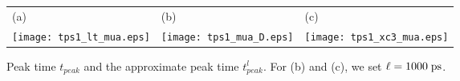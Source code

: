 \documentclass[10pt]{article}
\numberwithin{equation}{section}
\numberwithin{figure}{section}
\begin{document}
\begin{figure}[htp]
\centering
\begin{tabular}{lll}
(a) & (b) & (c) \\
\texttt{[image: tps1\_lt\_mua.eps]}
& \texttt{[image: tps1\_mua\_D.eps]}
& \texttt{[image: tps1\_xc3\_mua.eps]}
\end{tabular}
\caption{Peak time $t_{peak}$ and the approximate peak time $t_{peak}^{l}$. For (b) and (c), we set $\ell = 1000 \; {\rm ps}$.}
\label{fig_tps_linear_diffpara} 
\end{figure}

\begin{comment}
In addition, we numerically verify the accuracy of an approximate peak time defined by 
\eqref{sim_peak_formula}. See Figure \ref{fig_tps_diffpara1}.

\begin{figure}[htp]
\centering
\begin{tabular}{lll}
(a) & (b) & (c) \\
\texttt{[image: figures1/tps1\_lt\_mua\_s.eps]}
& \texttt{[image: figures1/tps1\_mua\_D\_s.eps]}
& \texttt{[image: figures1/tps1\_xc3\_mua\_s.eps]}
\end{tabular}
\caption{Peak time and approximate peak time for different physical parameters}
\label{fig_tps_diffpara1}
\end{figure}

Based on \eqref{eq_peaktime}, we numerically verify the accuracy of two approximate peak times
$$t_{peak}^{a1}=  k^{-\frac{1}{2}} \lambda + k^{-\frac{3}{4}}\lambda^\frac{1}{2},\quad
t_{peak}^{a2}=k^{-\frac{1}{2}} \lambda + k^{-\frac{3}{4}}\lambda^\frac{1}{2} - \textcolor{red}{\frac{1}{2}
 \pi^{\frac{1}{2}}k^{-\frac{3}{2}}
 \ell^{-1} \lambda}.$$
The results are shown in Figure \ref{fig_tps_diffpara2}.

 \begin{figure}[htp]
\centering
\begin{tabular}{lll}
(a) & (b) & (c) \\
\texttt{[image: figures1/tps12\_lt\_mua.eps]}
& \texttt{[image: figures1/tps12\_mua\_D.eps]}
& \texttt{[image: figures1/tps12\_xc3\_mua.eps]}
\end{tabular}
\caption{Peak time and approximate peak time for different physical parameters}
\label{fig_tps_diffpara2}
\end{figure}
\end{comment}
\end{document}

